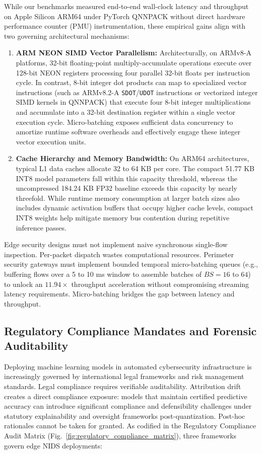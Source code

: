 \documentclass[conference]{IEEEtran}
\begin{document}
While our benchmarks measured end-to-end wall-clock latency and throughput on Apple Silicon ARM64 under PyTorch QNNPACK without direct hardware performance counter (PMU) instrumentation, these empirical gains align with two governing architectural mechanisms:
\begin{enumerate}
    \item \textbf{ARM NEON SIMD Vector Parallelism:} Architecturally, on ARMv8-A platforms, 32-bit floating-point multiply-accumulate operations execute over 128-bit NEON registers processing four parallel 32-bit floats per instruction cycle. In contrast, 8-bit integer dot products can map to specialized vector instructions (such as ARMv8.2-A \texttt{SDOT}/\texttt{UDOT} instructions or vectorized integer SIMD kernels in QNNPACK) that execute four 8-bit integer multiplications and accumulate into a 32-bit destination register within a single vector execution cycle. Micro-batching exposes sufficient data concurrency to amortize runtime software overheads and effectively engage these integer vector execution units.
    \item \textbf{Cache Hierarchy and Memory Bandwidth:} On ARM64 architectures, typical L1 data caches allocate 32 to 64 KB per core. The compact 51.77 KB INT8 model parameters fall within this capacity threshold, whereas the uncompressed 184.24 KB FP32 baseline exceeds this capacity by nearly threefold. While runtime memory consumption at larger batch sizes also includes dynamic activation buffers that occupy higher cache levels, compact INT8 weights help mitigate memory bus contention during repetitive inference passes.
\end{enumerate}

Edge security designs must not implement naive synchronous single-flow inspection. Per-packet dispatch wastes computational resources. Perimeter security gateways must implement bounded temporal micro-batching queues (e.g., buffering flows over a 5 to 10 ms window to assemble batches of $BS = 16$ to $64$) to unlock an $11.94\times$ throughput acceleration without compromising streaming latency requirements. Micro-batching bridges the gap between latency and throughput.

\subsection{Regulatory Compliance Mandates and Forensic Auditability}
Deploying machine learning models in automated cybersecurity infrastructure is increasingly governed by international legal frameworks and risk management standards. Legal compliance requires verifiable auditability. Attribution drift creates a direct compliance exposure: models that maintain certified predictive accuracy can introduce significant compliance and defensibility challenges under statutory explainability and oversight frameworks post-quantization. Post-hoc rationales cannot be taken for granted. As codified in the Regulatory Compliance Audit Matrix (Fig.~\ref{fig:regulatory_compliance_matrix}), three frameworks govern edge NIDS deployments:
\end{document}
